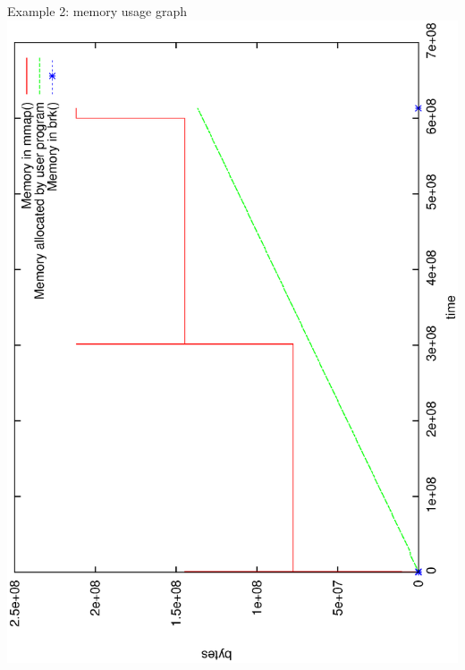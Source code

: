 \documentclass{beamer}
\begin{document}
\begin{frame}{Example 2: memory usage graph}
    \includegraphics[scale=0.4]{memory}
\end{frame}
\end{document}
